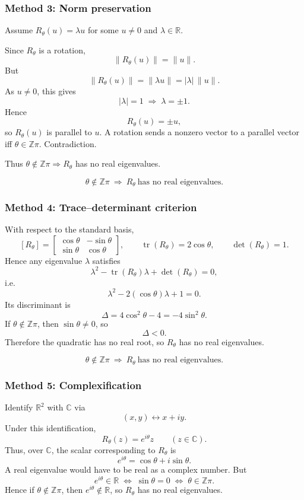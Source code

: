 \documentclass[12pt]{article}
\newcommand{\R}{\mathbb{R}}
\newcommand{\C}{\mathbb{C}}
\DeclareMathOperator{\tr}{tr}
\begin{document}
\subsubsection{Method 3: Norm preservation}

Assume $R_\theta(u)=\lambda u$ for some $u\neq 0$ and $\lambda\in\R$.

Since $R_\theta$ is a rotation,
\[
\|R_\theta(u)\|=\|u\|.
\]
But
\[
\|R_\theta(u)\|=\|\lambda u\|=|\lambda|\,\|u\|.
\]
As $u\neq 0$, this gives
\[
|\lambda|=1 \;\Longrightarrow\; \lambda=\pm1.
\]
Hence
\[
R_\theta(u)=\pm u,
\]
so $R_\theta(u)$ is parallel to $u$. A rotation sends a nonzero vector to a parallel vector iff $\theta\in\mathbb{Z}\pi$. Contradiction.

Thus $\theta\notin\mathbb{Z}\pi \Rightarrow R_\theta$ has no real eigenvalues.

\[
\boxed{\,\theta\notin\mathbb{Z}\pi\ \Longrightarrow\ R_{\theta}\ \text{has no real eigenvalues.}\,}
\]

\newpage
\subsubsection{Method 4: Trace--determinant criterion}

With respect to the standard basis,
\[
[R_\theta]=
\begin{bmatrix}
\cos\theta & -\sin\theta\\
\sin\theta & \cos\theta
\end{bmatrix},
\qquad
\tr(R_\theta)=2\cos\theta,\qquad
\det(R_\theta)=1.
\]
Hence any eigenvalue $\lambda$ satisfies
\[
\lambda^2-\tr(R_\theta)\lambda+\det(R_\theta)=0,
\]
i.e.
\[
\lambda^2-2(\cos\theta)\lambda+1=0.
\]
Its discriminant is
\[
\Delta = 4\cos^2\theta-4 = -4\sin^2\theta.
\]
If $\theta\notin\mathbb{Z}\pi$, then $\sin\theta\neq 0$, so
\[
\Delta<0.
\]
Therefore the quadratic has no real root, so $R_\theta$ has no real eigenvalues.

\[
\boxed{\,\theta\notin\mathbb{Z}\pi\ \Longrightarrow\ R_{\theta}\ \text{has no real eigenvalues.}\,}
\]

\subsubsection{Method 5: Complexification}

Identify $\R^2$ with $\C$ via
\[
(x,y)\longleftrightarrow x+iy.
\]
Under this identification,
\[
R_\theta(z)=e^{i\theta}z \qquad (z\in\C).
\]
Thus, over $\C$, the scalar corresponding to $R_\theta$ is
\[
e^{i\theta}=\cos\theta+i\sin\theta.
\]
A real eigenvalue would have to be real as a complex number. But
\[
e^{i\theta}\in\R
\;\Longleftrightarrow\;
\sin\theta=0
\;\Longleftrightarrow\;
\theta\in\mathbb{Z}\pi.
\]
Hence if $\theta\notin\mathbb{Z}\pi$, then $e^{i\theta}\notin\R$, so $R_\theta$ has no real eigenvalues.
\end{document}
